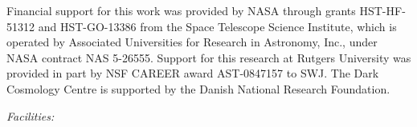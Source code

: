 Financial support for this work was provided by NASA through grants
HST-HF-51312 and HST-GO-13386 from the Space Telescope
Science Institute, which is operated by Associated Universities for
Research in Astronomy, Inc., under NASA contract NAS 5-26555.  Support
for this research at Rutgers University was provided in part by NSF
CAREER award AST-0847157 to SWJ.  The Dark Cosmology Centre is
supported by the Danish National Research Foundation.


{\it Facilities:} 
\smallskip






